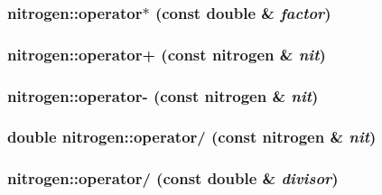 \label{classnitrogen_a94db6c475800d3030ebf24f2eb66e94f}
\hypertarget{classnitrogen_a8a735edcd947b58be5d4ca5f2cab4cdc}{
\subsubsection[{operator$\ast$}]{ nitrogen::operator$\ast$ (const double \& {\em factor})}}
\label{classnitrogen_a8a735edcd947b58be5d4ca5f2cab4cdc}
\hypertarget{classnitrogen_af4923bd19f83ad6b426d6bd4ed06513e}{
\subsubsection[{operator+}]{ nitrogen::operator+ (const {\bf nitrogen} \& {\em nit})}}
\label{classnitrogen_af4923bd19f83ad6b426d6bd4ed06513e}
\hypertarget{classnitrogen_afe547bcf71290e3ef2cecb268c6745f5}{
\subsubsection[{operator-\/}]{ nitrogen::operator-\/ (const {\bf nitrogen} \& {\em nit})}}
\label{classnitrogen_afe547bcf71290e3ef2cecb268c6745f5}
\hypertarget{classnitrogen_a07f81b8595e3272a8a1ab1e27cdcc9d7}{
\subsubsection[{operator/}]{\setlength{\rightskip}{0pt plus 5cm}double nitrogen::operator/ (const {\bf nitrogen} \& {\em nit})}}
\label{classnitrogen_a07f81b8595e3272a8a1ab1e27cdcc9d7}
\hypertarget{classnitrogen_a4e8a3471eb396100d47188f7d137d361}{
\subsubsection[{operator/}]{ nitrogen::operator/ (const double \& {\em divisor})}}
